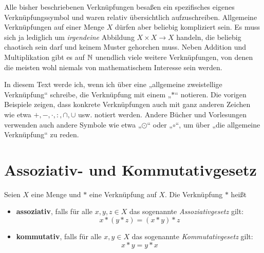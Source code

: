 \begin{bem}
    Alle bisher beschriebenen Verknüpfungen besaßen ein spezifisches eigenes Verknüpfungssymbol und waren relativ übersichtlich aufzuschreiben. Allgemeine Verknüpfungen auf einer Menge $X$ dürfen aber beliebig kompliziert sein. Es muss sich ja lediglich um \emph{irgendeine} Abbildung $X\times X\to X$ handeln, die beliebig chaotisch sein darf und keinem Muster gehorchen muss. Neben Addition und Multiplikation gibt es auf $\mathbb N$ unendlich viele weitere Verknüpfungen, von denen die meisten wohl niemals von mathematischem Interesse sein werden.
\end{bem}


\begin{nota}[Verknüpfungssymbole]
    In diesem Text werde ich, wenn ich über eine „allgemeine zweistellige Verknüpfung“ schreibe, die Verknüpfung mit einem „$*$“ notieren. Die vorigen Beispiele zeigen, dass konkrete Verknüpfungen auch mit ganz anderen Zeichen wie etwa $+,-,\cdot,:,\cap,\cup$ usw. notiert werden. Andere Bücher und Vorlesungen verwenden auch andere Symbole wie etwa „$\odot$“ oder „$\circ$“, um über „die allgemeine Verknüpfung“ zu reden.
\end{nota}





\section{Assoziativ- und Kommutativgesetz}


\begin{de}  
    Seien $X$ eine Menge und $*$ eine Verknüpfung auf $X$. Die Verknüpfung $*$ heißt
    \begin{itemize}
        \item \textbf{assoziativ}, falls für alle $x,y,z\in X$ das sogenannte \emph{Assoziativgesetz} gilt:
            \[ x*(y*z) = (x*y)*z \]
        \item \textbf{kommutativ}, falls für alle $x,y\in X$ das sogenannte \emph{Kommutativgesetz} gilt:
            \[ x*y = y*x \]
    \end{itemize}
\end{de}


